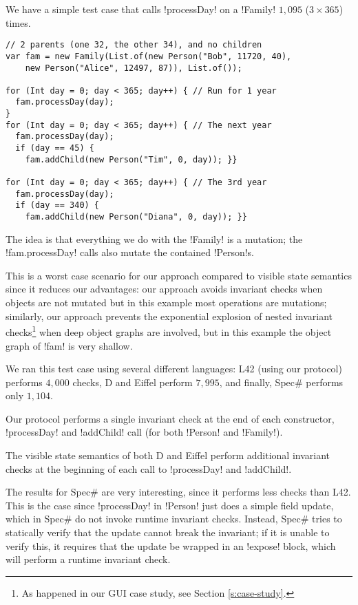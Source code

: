 We have a simple test case that calls \Q!processDay! on a \Q!Family! $1{,}095$ ($3\times365$) times.
\begin{lstlisting}
// 2 parents (one 32, the other 34), and no children
var fam = new Family(List.of(new Person("Bob", 11720, 40),
    new Person("Alice", 12497, 87)), List.of());
    
for (Int day = 0; day < 365; day++) { // Run for 1 year
  fam.processDay(day);
}
for (Int day = 0; day < 365; day++) { // The next year
  fam.processDay(day);
  if (day == 45) {
    fam.addChild(new Person("Tim", 0, day)); }}

for (Int day = 0; day < 365; day++) { // The 3rd year
  fam.processDay(day);
  if (day == 340) {
    fam.addChild(new Person("Diana", 0, day)); }}
\end{lstlisting}

The idea is that everything we do with the \Q!Family! is a mutation; the \Q!fam.processDay! calls also mutate the contained \Q!Person!s.

This is a worst case scenario for our approach compared to visible state semantics since it reduces our advantages:
our approach avoids invariant checks when objects are not mutated
but in this example most operations are mutations; 
similarly, our approach prevents the exponential explosion of nested invariant checks\footnote{As happened in our GUI case study, see Section \ref{s:case-study}.} when deep object graphs are involved, but in this example the object graph of \Q!fam! is very shallow.

We ran this test case using several different languages: L42 (using our protocol) performs $4{,}000$ checks, D and Eiffel perform $7{,}995$, and finally, Spec\# performs only $1{,}104$.

Our protocol performs a single invariant check at the end of each constructor,  \Q!processDay! and \Q!addChild! call (for both \Q!Person! and \Q!Family!). 

The visible state semantics of both D and Eiffel perform additional invariant checks at the beginning of each call to \Q!processDay! and \Q!addChild!.

The results for Spec\# are very interesting, since it performs less checks than L42.
This is the case since \Q!processDay! in \Q!Person! just does a simple field update, which in Spec\# do not invoke runtime invariant checks. Instead, Spec\# tries to statically verify that the update cannot break the invariant; if it is unable to verify this, it requires that the update be wrapped in an \Q!expose! block, which will perform a runtime invariant check. 

